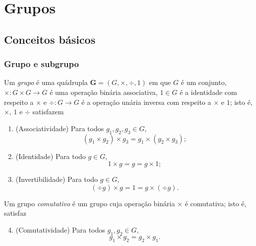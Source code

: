 \chapter{Grupos}

\section{Conceitos básicos}

\subsection{Grupo e subgrupo}

\begin{definition}
Um \emph{grupo} é uma quádrupla $\bm G=(G,\times,\div,1)$ em que $G$ é um conjunto, $\times \colon G \times G \to G$ é uma operação binária associativa, $1 \in G$ é a identidade com respeito a $\times$ e $\div \colon G \to G$ é a operação unária inversa com respeito a $\times$ e $1$; isto é, $\times$, $1$ e $\div$ satisfazem
	\begin{enumerate}[label=\textbf{G\arabic*.},ref={G\arabic*}]
	\item \label{G1}(Associatividade) Para todos $g_1,g_2,g_3 \in G$,
		\begin{equation*}
		(g_1 \times g_2) \times g_3 = g_1 \times (g_2 \times g_3);
		\end{equation*}
	\item \label{G2} (Identidade) Para todo $g \in G$,
		\begin{equation*}
		1 \times g = g =g \times 1;
		\end{equation*}
	\item \label{G3} (Invertibilidade) Para todo $g \in G$,
		\begin{equation*}
		(\div g) \times g = 1 = g \times (\div g).
		\end{equation*}
	\end{enumerate}
\noindent
Um grupo \emph{comutativo} é um grupo cuja operação binária $\times$ é comutativa; isto é, satisfaz
	\begin{enumerate}[label=\textbf{G\arabic*.},ref={G\arabic*}]
	\setcounter{enumi}{3}
	\item \label{G4} (Comutatividade) Para todos $g_1,g_2 \in G$,
	\begin{equation*}
	g_1 \times g_2 = g_2 \times g_1.
	\end{equation*}
	\end{enumerate}
\end{definition}

